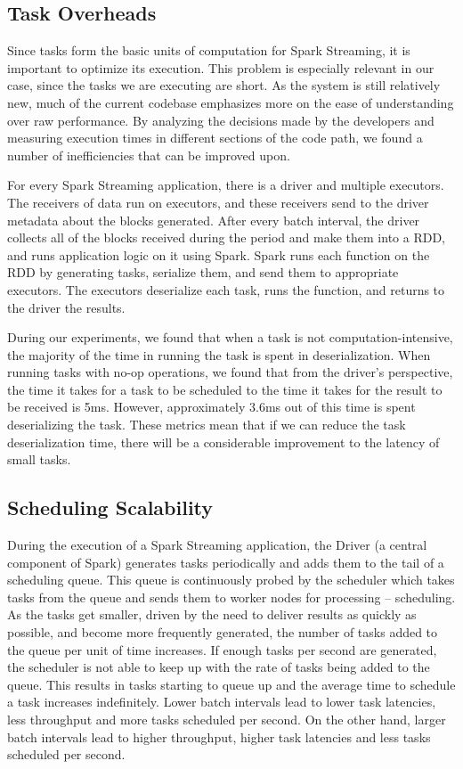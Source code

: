 \subsection{Task Overheads}
Since tasks form the basic units of computation for Spark Streaming, it is important to optimize its execution. This problem is especially relevant in our case, since the tasks we are executing are short. As the system is still relatively new, much of the current codebase emphasizes more on the ease of understanding over raw performance. By analyzing the decisions made by the developers and measuring execution times in different sections of the code path, we found a number of inefficiencies that can be improved upon.

For every Spark Streaming application, there is a driver and multiple executors. The receivers of data run on executors, and these receivers send to the driver metadata about the blocks generated. After every batch interval, the driver collects all of the blocks received during the period and make them into a RDD, and runs application logic on it using Spark. Spark runs each function on the RDD by generating tasks, serialize them, and send them to appropriate executors. The executors deserialize each task, runs the function, and returns to the driver the results.

During our experiments, we found that when a task is not computation-intensive, the majority of the time in running the task is spent in deserialization. When running tasks with no-op operations, we found that from the driver's perspective, the time it takes for a task to be scheduled to the time it takes for the result to be received is 5ms. However, approximately 3.6ms out of this time is spent deserializing the task. These metrics mean that if we can reduce the task deserialization time, there will be a considerable improvement to the latency of small tasks.


\subsection{Scheduling Scalability}

During the execution of a Spark Streaming application, the Driver (a central component of Spark) generates tasks periodically and adds them to the tail of a scheduling queue. This queue is continuously probed by the scheduler which takes tasks from the queue and sends them to worker nodes for processing -- scheduling.
As the tasks get smaller, driven by the need to deliver results as quickly as possible, and become more frequently generated, the number of tasks added to the queue per unit of time increases. If enough tasks per second are generated, the scheduler is not able to keep up with the rate of tasks being added to the queue. This results in tasks starting to queue up and the average time to schedule a task increases indefinitely.
Lower batch intervals lead to lower task latencies, less throughput and more tasks scheduled per second. On the other hand, larger batch intervals lead to higher throughput, higher task latencies and less tasks scheduled per second. 

